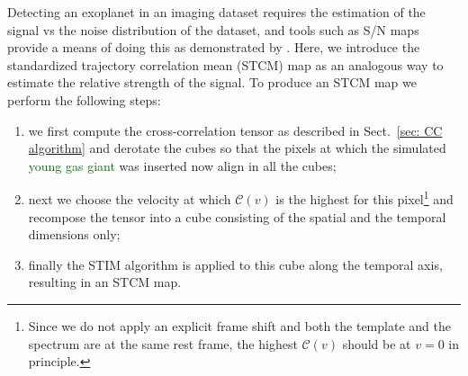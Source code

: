 \documentclass[referee]{aa} %
\newcommand{\newchange}[1]{\textcolor{darkgreen}{#1}}
\begin{document}
Detecting an exoplanet in an imaging dataset requires the estimation of the signal vs the noise distribution of the dataset, and tools such as S/N maps provide a means of doing this as demonstrated by \citet{2014MawetSNR}.
Here, we introduce the standardized trajectory correlation mean (STCM) map as an analogous way to estimate the relative strength of the signal. To produce an STCM map we perform the following steps:
\begin{enumerate}
    \item we first compute the cross-correlation tensor as described in Sect.~\ref{sec: CC algorithm} and derotate the cubes so that the pixels at which the simulated \newchange{young gas giant} was inserted now align in all the cubes;
    \item next we choose the velocity at which $\mathcal{C}(v)$ is the highest for this pixel\footnote{Since we do not apply an explicit frame shift and both the template and the spectrum are at the same rest frame, the highest $\mathcal{C}(v)$ should be at $v=0$ in principle.} and recompose the tensor into a cube consisting of the spatial and the temporal dimensions only;
    \item finally the STIM algorithm is applied to this cube along the temporal axis, resulting in an STCM map.
\end{enumerate}
\end{document}
